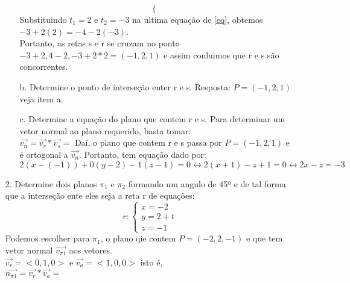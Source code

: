 \documentclass{article} %
\begin{document}
\begin{itemize}
\begin{itemize}
\begin{equation}
\begin{cases}
    \end{cases}
    \end{equation}
    Substituindo $t_1 = 2$ e $t_2 = -3$ na ultima equação de \eqref{eq}, obtemos $-3+2(2) = -4 -2(-3)$. \\
    Portanto, as retas s e r se cruzam no ponto $-3 +2, 4-2, -3+2*2 = (-1,2,1)$ e assim conluimos que r e s são concorrentes.
    \item[b.] Determine o ponto de interseção enter r e s. 
            Resposta: $P = (-1,2,1)$ veja item a.
    \item[c.] Determine a equação do plano que contem r e s.
    Para determinar um vetor normal ao plano requerido, basta tomar: \\
    $\overrightarrow{v_n} = \overrightarrow{v_r} * \overrightarrow{v_s} = $
    Daí, o plano que contem r e s passa por $P=(-1,2,1)$ e é ortogonal a $\overrightarrow{v_n}$. Portanto, tem equação dado por: \\
    \begin{equation}
        2(x-(-1)) + 0(y-2) - 1(z-1) = 0 \leftrightarrow 2(x+1) -z+1 = 0 \leftrightarrow 2x - z = -3
    \end{equation}
    \end{itemize}
    \item[2.] Determine dois planos $\pi_1$ e $\pi_2$ formando um angulo de 45º e de tal forma que a interseção ente eles seja a reta r de equações:
    \begin{equation}
        r: 
    \begin{cases}
        x=-2 \\
        y=2+t \\
        z = -1
    \end{cases}
    \end{equation}
    Podemos escolher para $\pi_1$, o plano qie contem $P=(-2,2,-1)$ e que tem vetor normal $\overrightarrow{v_{\pi1}}$ aos vetores. \\
    $\overrightarrow{v_r} = <0,1,0>$ e $\overrightarrow{v_a} = <1,0,0>$ isto é, \\
    $\overrightarrow{n_{\pi1}} = \overrightarrow{v_r} * \overrightarrow{v_a} = $

\end{itemize}
\end{document}
